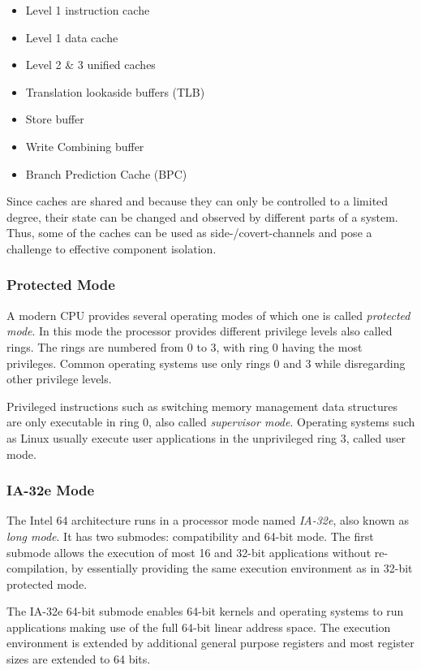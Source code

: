\begin{itemize}
	\item Level 1 instruction cache
	\item Level 1 data cache
	\item Level 2 \& 3 unified caches
	\item Translation lookaside buffers (TLB)
	\item Store buffer
	\item Write Combining buffer
	\item Branch Prediction Cache (BPC)
\end{itemize}

Since caches are shared and because they can only be controlled to a limited
degree, their state can be changed and observed by different parts of a system.
Thus, some of the caches can be used as side-/covert-channels
and pose a challenge to effective component isolation.

\subsubsection{Protected Mode}
A modern CPU provides several operating modes of which one is called
\emph{protected mode}. In this mode the processor
provides different privilege levels also called rings. The rings
are numbered from 0 to 3, with ring 0 having the most privileges. Common
operating systems use only rings 0 and 3 while disregarding other privilege
levels.

Privileged instructions such as switching memory management data structures are
only executable in ring 0, also called \emph{supervisor mode}. Operating systems such as Linux usually execute user applications in the
unprivileged ring 3, called user mode.

\subsubsection{IA-32e Mode}
The Intel 64 architecture runs in a processor mode named
\emph{IA-32e}, also known as \emph{long mode}.
It has two submodes: compatibility and 64-bit mode.  The first submode allows
the execution of most 16 and 32-bit applications without re-compilation, by
essentially providing the same execution environment as in 32-bit protected
mode.

The IA-32e 64-bit submode enables 64-bit kernels and operating systems to run
applications making use of the full 64-bit linear address space. The execution
environment is extended by additional general purpose registers and most
register sizes are extended to 64 bits.

